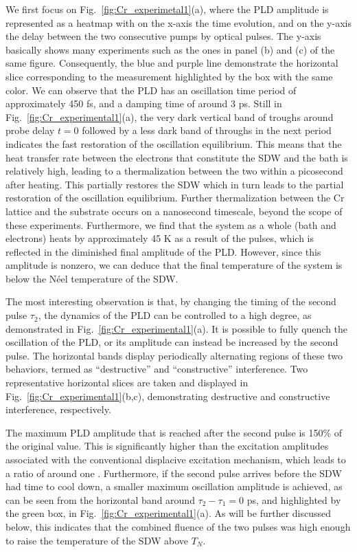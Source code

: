 We first focus on Fig.~\ref{fig:Cr_experimetal1}(a), where the PLD amplitude is represented as a heatmap with on the x-axis the time evolution, and on the y-axis the delay between the two consecutive pumps by optical pulses. The y-axis basically shows many experiments such as the ones in panel (b) and (c) of the same figure. Consequently, the blue and purple line demonstrate the horizontal slice corresponding to the measurement highlighted by the box with the same color.  
We can observe that the PLD has an oscillation time period of approximately 450 fs, and a damping time of around 3 ps.
Still in Fig.~\ref{fig:Cr_experimental1}(a), the very dark vertical band of troughs around probe delay $t = 0$ followed by a less dark band of throughs in the next period indicates the fast restoration of the oscillation equilibrium. 
This means that the heat transfer rate between the electrons that constitute the SDW and the bath is relatively high, leading to a thermalization between the two within a picosecond after heating.
This partially restores the SDW which in turn leads to the partial restoration of the oscillation equilibrium.
Further thermalization between the Cr lattice and the substrate occurs on a nanosecond timescale, beyond the scope of these experiments.
Furthermore, we find that the system as a whole (bath and electrons) heats by approximately 45 K as a result of the pulses, which is reflected in the diminished final amplitude of the PLD.
However, since this amplitude is nonzero, we can deduce that the final temperature of the system is below the N\'eel temperature of the SDW.

The most interesting observation is that, by changing the timing of the second pulse $\tau_2$, the dynamics of the PLD can be controlled to a high degree, as demonstrated in Fig.~\ref{fig:Cr_experimental1}(a).
It is possible to fully quench the oscillation of the PLD, or its amplitude can instead be increased by the second pulse.
The horizontal bands display periodically alternating regions of these two behaviors, termed as ``destructive'' and ``constructive'' interference.
Two representative horizontal slices are taken and displayed in Fig.~\ref{fig:Cr_experimental1}(b,c), demonstrating destructive and constructive interference, respectively. 

The maximum PLD amplitude that is reached after the second pulse is 150\% of the original value.
This is significantly higher than the excitation amplitudes associated with the conventional displacive excitation mechanism, which leads to a ratio of around one \cite{Singer2015prl,Zeiger1992}. 
Furthermore, if the second pulse arrives before the SDW had time to cool down, a smaller maximum oscillation amplitude is achieved, as can be seen from the horizontal band around $\tau_2 - \tau_1 = 0$ ps, and highlighted by the green box, in Fig.~\ref{fig:Cr_experimental1}(a).
As will be further discussed below, this indicates that the combined fluence of the two pulses was high enough to raise the temperature of the SDW above $T_N$.

